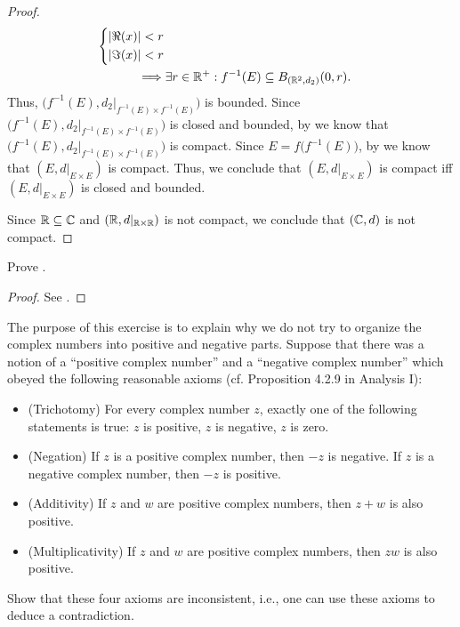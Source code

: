 \begin{proof}
\begin{align*}
\begin{dcases}
                                                       \left\lvert\Re(x)\right\rvert < r \\
                                                       \left\lvert\Im(x)\right\rvert < r
                                                     \end{dcases}                                                       \\
    \implies & \exists r \in \mathbb{R}^+ : f^{-1}(E) \subseteq B_{(\mathbb{R}^2, d_2)}(0, r).
  \end{align*}
  Thus, \(\big(f^{-1}(E), d_2|_{f^{-1}(E) \times f^{-1}(E)}\big)\) is bounded.
  Since \(\big(f^{-1}(E), d_2|_{f^{-1}(E) \times f^{-1}(E)}\big)\) is closed and bounded, by  we know that \(\big(f^{-1}(E), d_2|_{f^{-1}(E) \times f^{-1}(E)}\big)\) is compact.
  Since \(E = f\big(f^{-1}(E)\big)\), by  we know that \((E, d|_{E \times E})\) is compact.
  Thus, we conclude that \((E, d|_{E \times E})\) is compact iff \((E, d|_{E \times E})\) is closed and bounded.

  Since \(\mathbb{R} \subseteq \mathbb{C}\) and \((\mathbb{R}, d|_{\mathbb{R} \times \mathbb{R}})\) is not compact, we conclude that \((\mathbb{C}, d)\) is not compact.
\end{proof}

\begin{ex}\label{ii:ex:4.6.14}
  Prove .
\end{ex}

\begin{proof}
  See .
\end{proof}

\begin{ex}\label{ii:ex:4.6.15}
  The purpose of this exercise is to explain why we do not try to organize the complex numbers into positive and negative parts.
  Suppose that there was a notion of a ``positive complex number'' and a ``negative complex number'' which obeyed the following reasonable axioms (cf. Proposition 4.2.9 in Analysis I):
  \begin{itemize}
    \item (Trichotomy)
          For every complex number \(z\), exactly one of the following statements is true:
          \(z\) is positive, \(z\) is negative, \(z\) is zero.
    \item (Negation)
          If \(z\) is a positive complex number, then \(-z\) is negative.
          If \(z\) is a negative complex number, then \(-z\) is positive.
    \item (Additivity)
          If \(z\) and \(w\) are positive complex numbers, then \(z + w\) is also positive.
    \item (Multiplicativity)
          If \(z\) and \(w\) are positive complex numbers, then \(zw\) is also positive.
  \end{itemize}
  Show that these four axioms are inconsistent, i.e., one can use these axioms to deduce a contradiction.
\end{ex}

